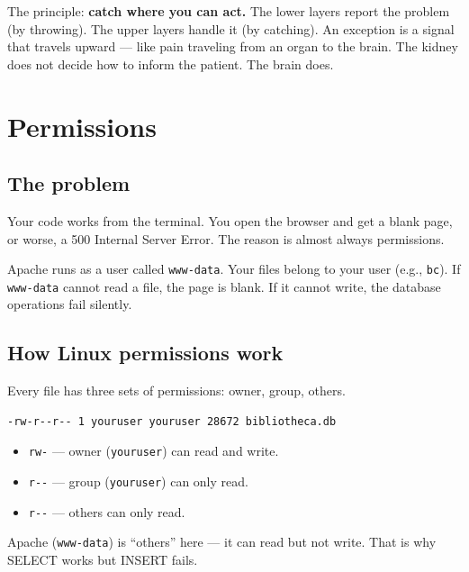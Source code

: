 \documentclass[11pt,a4paper,oneside]{book}
\providecommand{\tightlist}{%
  \setlength{\itemsep}{0pt}\setlength{\parskip}{0pt}}
\begin{document}
The principle: \textbf{catch where you can act.} The lower layers
report the problem (by throwing). The upper layers handle it (by
catching). An exception is a signal that travels upward --- like
pain traveling from an organ to the brain. The kidney does not
decide how to inform the patient. The brain does.

\newpage

\hypertarget{permissions}{%
\chapter{Permissions}\label{permissions}}

\hypertarget{the-problem}{%
\section{The problem}\label{the-problem}}

Your code works from the terminal. You open the browser and get a
blank page, or worse, a 500 Internal Server Error. The reason is
almost always permissions.

Apache runs as a user called \texttt{www-data}. Your files belong
to your user (e.g., \texttt{bc}). If \texttt{www-data} cannot
read a file, the page is blank. If it cannot write, the database
operations fail silently.

\hypertarget{how-linux-permissions-work}{%
\section{How Linux permissions
work}\label{how-linux-permissions-work}}

Every file has three sets of permissions: owner, group, others.

\begin{verbatim}
-rw-r--r-- 1 youruser youruser 28672 bibliotheca.db
\end{verbatim}

\begin{itemize}
\tightlist
\item
  \texttt{rw-} --- owner (\texttt{youruser}) can read and write.
\item
  \texttt{r-\/-} --- group (\texttt{youruser}) can only read.
\item
  \texttt{r-\/-} --- others can only read.
\end{itemize}

Apache (\texttt{www-data}) is ``others'' here --- it can read but
not write. That is why SELECT works but INSERT fails.
\end{document}
